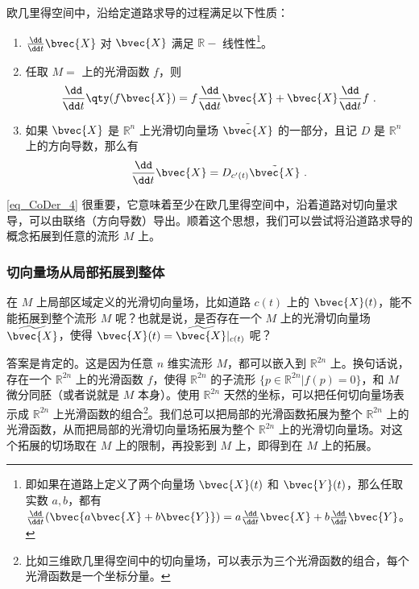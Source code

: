 欧几里得空间中，沿给定道路求导的过程满足以下性质：
\begin{enumerate}
\item $\frac{\dd }{\dd t}\bvec{X}$ 对 $\bvec{X}$ 满足 $\mathbb{R}-$ 线性性\footnote{即如果在道路上定义了两个向量场 $\bvec{X}(t)$ 和 $\bvec{Y}(t)$，那么任取实数 $a, b$，都有 $\frac{\dd}{\dd t}(\bvec{a\bvec{X}+b\bvec{Y}})=a\frac{\dd}{\dd t}\bvec{X}+b\frac{\dd}{\dd t}\bvec{Y}$。}。
\item 任取 $M=$ 上的光滑函数 $f$，则
\begin{equation}
\frac{\dd}{\dd t}\qty(f\bvec{X})=f\frac{\dd}{\dd t}\bvec{X}+\bvec{X}\frac{\dd}{\dd t}f~.
\end{equation}
\item 如果 $\bvec{X}$ 是 $\mathbb{R}^n$ 上光滑切向量场 $\tilde{\bvec{X}}$ 的一部分，且记 $D$ 是 $\mathbb{R}^n$ 上的方向导数，那么有
\begin{equation}\label{eq_CoDer_4}
\frac{\dd}{\dd t}\bvec{X}=D_{c'(t)}\tilde{\bvec{X}}~.
\end{equation}

\end{enumerate}

\autoref{eq_CoDer_4} 很重要，它意味着至少在欧几里得空间中，沿着道路对切向量求导，可以由联络（方向导数）导出。顺着这个思想，我们可以尝试将沿道路求导的概念拓展到任意的流形 $M$ 上。 

\subsubsection{切向量场从局部拓展到整体}

在 $M$ 上局部区域定义的光滑切向量场，比如道路 $c(t)$ 上的 $\bvec{X}(t)$，能不能拓展到整个流形 $M$ 呢？也就是说，是否存在一个 $M$ 上的光滑切向量场 $\widetilde{\bvec{X}}$，使得 $\bvec{X}(t)=\widetilde{\bvec{X}}|_{c(t)}$ 呢？

答案是肯定的。这是因为任意 $n$ 维实流形 $M$，都可以嵌入到 $\mathbb{R}^{2n}$ 上。换句话说，存在一个 $\mathbb{R}^{2n}$ 上的光滑函数 $f$，使得 $\mathbb{R}^{2n}$ 的子流形 $\{p\in\mathbb{R}^{2n}|f(p)=0\}$，和 $M$ 微分同胚（或者说就是 $M$ 本身）。使用 $\mathbb{R}^{2n}$ 天然的坐标，可以把任何切向量场表示成 $\mathbb{R}^{2n}$ 上光滑函数的组合\footnote{比如三维欧几里得空间中的切向量场，可以表示为三个光滑函数的组合，每个光滑函数是一个坐标分量。}。我们总可以把局部的光滑函数拓展为整个 $\mathbb{R}^{2n}$ 上的光滑函数，从而把局部的光滑切向量场拓展为整个 $\mathbb{R}^{2n}$ 上的光滑切向量场。对这个拓展的切场取在 $M$ 上的限制，再投影到 $M$ 上，即得到在 $M$ 上的拓展。

